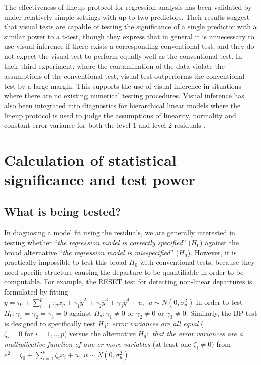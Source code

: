 \documentclass[]{interact}
\theoremstyle{plain}%
\theoremstyle{definition}
\theoremstyle{remark}
\begin{document}
The effectiveness of lineup protocol for regression analysis has been
validated by \citet{majumder2013validation} under relatively simple
settings with up to two predictors. Their results suggest that visual
tests are capable of testing the significance of a single predictor with
a similar power to a t-test, though they express that in general it is
unnecessary to use visual inference if there exists a corresponding
conventional test, and they do not expect the visual test to perform
equally well as the conventional test. In their third experiment, where
the contamination of the data violate the assumptions of the
conventional test, visual test outperforms the conventional test by a
large margin. This supports the use of visual inference in situations
where there are no existing numerical testing procedures. Visual
inference has also been integrated into diagnostics for hierarchical
linear models where the lineup protocol is used to judge the assumptions
of linearity, normality and constant error variance for both the level-1
and level-2 residuals
\citep{loy2013diagnostic, loy2014hlmdiag, loy2015you}.

\hypertarget{significance-calculation}{%
\section{Calculation of statistical significance and test
power}\label{significance-calculation}}

\hypertarget{what-is-being-tested}{%
\subsection{What is being tested?}\label{what-is-being-tested}}

In diagnosing a model fit using the residuals, we are generally
interested in testing whether ``\emph{the regression model is correctly
specified}'' (\(H_0\)) against the broad alternative ``\emph{the
regression model is misspecified}'' (\(H_a\)). However, it is
practically impossible to test this broad \(H_0\) with conventional
tests, because they need specific structure causing the departure to be
quantifiable in order to be computable. For example, the RESET test for
detecting non-linear departures is formulated by fitting
\(y = \tau_0 + \sum_{i=1}^{p}\tau_px_p +\gamma_1\hat{y}^2 + \gamma_2\hat{y}^3 + \gamma_3\hat{y}^4 + u, ~~u \sim N(0, \sigma_u^2)\)
in order to test \(H_0:\gamma_1 = \gamma_2 = \gamma_3 = 0\) against
\(H_a: \gamma_1 \neq 0 \text{ or } \gamma_2 \neq 0 \text{ or } \gamma_3 \neq 0\).
Similarly, the BP test is designed to specifically test \(H_0:\)
\emph{error variances are all equal}
(\(\zeta_i=0 \text{ for } i=1,..,p\)) versus the alternative \(H_a:\)
\emph{that the error variances are a multiplicative function of one or
more variables} (\(\text{at least one } \zeta_i\neq 0\)) from
\(e^2 = \zeta_0 + \sum_{i=1}^{p}\zeta_i x_i + u, ~ u\sim N(0,\sigma_u^2)\).
\end{document}
